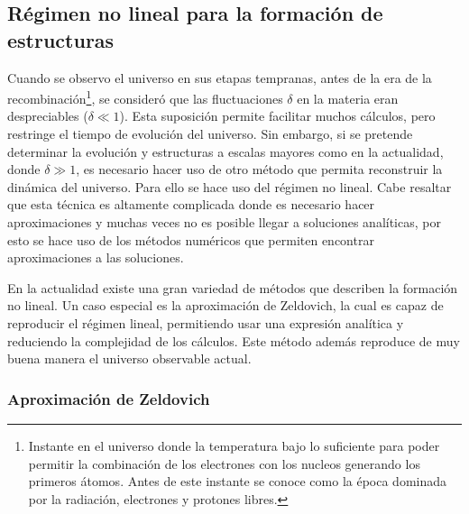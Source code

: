\subsection{Régimen no lineal para la formación de estructuras}
\label{subsec:non-Lineal_Estructure_Formation}

Cuando se observo el universo en sus etapas tempranas, antes de la era de la recombinación\footnote{Instante en el universo donde la temperatura bajo lo suficiente para poder permitir la combinación de los electrones con los nucleos generando los primeros átomos. Antes de este instante se conoce como la época dominada por la radiación, electrones y protones libres.}, se consideró que las fluctuaciones $\delta$  en la materia eran despreciables ($\delta \ll 1$). Esta suposición permite facilitar muchos cálculos, pero restringe el tiempo de evolución del universo. Sin embargo, si se pretende determinar la evolución y estructuras a escalas mayores como en la actualidad, donde $\delta \gg 1$, es necesario hacer uso de otro método que permita reconstruir la dinámica del universo. Para ello se hace uso del régimen no lineal. Cabe resaltar que esta técnica es altamente complicada donde es necesario hacer aproximaciones y muchas veces no es posible llegar a soluciones analíticas, por esto se hace uso de los métodos numéricos que permiten encontrar aproximaciones a las soluciones. 

En la actualidad existe una gran variedad de métodos que describen la formación no lineal. Un caso especial es la aproximación de Zeldovich, la cual es capaz de reproducir el régimen lineal, permitiendo usar una  expresión analítica y reduciendo la complejidad de los cálculos. Este método además reproduce de muy buena manera el universo observable actual.




	\subsubsection{Aproximación de Zeldovich}
	\label{subsubsec:Zeldovich_Aproximation}

